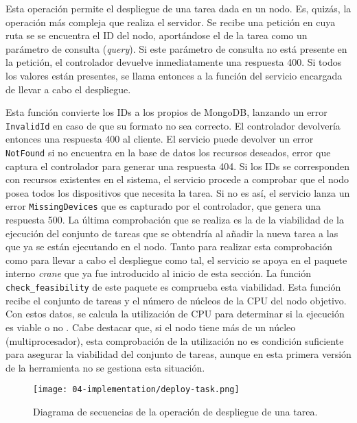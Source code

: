 \begin{itemize}
          Esta operación permite el despliegue de una tarea dada en un nodo. Es,
          quizás, la operación más compleja que realiza el servidor. Se recibe
          una petición en cuya ruta se se encuentra el ID del nodo, aportándose
          el de la tarea como un parámetro de consulta (\textit{query}). Si este
          parámetro de consulta no está presente en la petición, el controlador
          devuelve inmediatamente una respuesta 400. Si todos los valores están
          presentes, se llama entonces a la función del servicio encargada de
          llevar a cabo el despliegue.

          Esta función convierte los IDs a los propios de MongoDB, lanzando un
          error \texttt{InvalidId} en caso de que su formato no sea correcto. El
          controlador devolvería entonces una respuesta 400 al cliente. El
          servicio puede devolver un error \texttt{NotFound} si no encuentra en
          la base de datos los recursos deseados, error que captura el
          controlador para generar una respuesta 404. Si los IDs se corresponden
          con recursos existentes en el sistema, el servicio procede a comprobar
          que el nodo posea todos los dispositivos que necesita la tarea. Si no
          es así, el servicio lanza un error \texttt{MissingDevices} que es
          capturado por el controlador, que genera una respuesta 500. La última
          comprobación que se realiza es la de la viabilidad de la ejecución del
          conjunto de tareas que se obtendría al añadir la nueva tarea a las que
          ya se están ejecutando en el nodo. Tanto para realizar esta
          comprobación como para llevar a cabo el despliegue como tal, el
          servicio se apoya en el paquete interno \textit{crane} que ya fue
          introducido al inicio de esta sección. La función
          \texttt{check\_feasibility} de este paquete es comprueba esta
          viabilidad. Esta función recibe el conjunto de tareas y el número de
          núcleos de la CPU del nodo objetivo. Con estos datos, se calcula la
          utilización de CPU para determinar si la ejecución es viable o no
          \cite{zhang_schedulability_2009}. Cabe destacar que, si el nodo tiene
          más de un núcleo (multiprocesador), esta comprobación de la
          utilización no es condición suficiente para asegurar la viabilidad del
          conjunto de tareas, aunque en esta primera versión de la herramienta
          no se gestiona esta situación.

          \begin{figure}
              \centering
              \texttt{[image: 04-implementation/deploy-task.png]}
              \caption{Diagrama de secuencias de la operación de despliegue de una tarea.}
              \label{fig:04-deploy_task}
          \end{figure}


\end{itemize}
